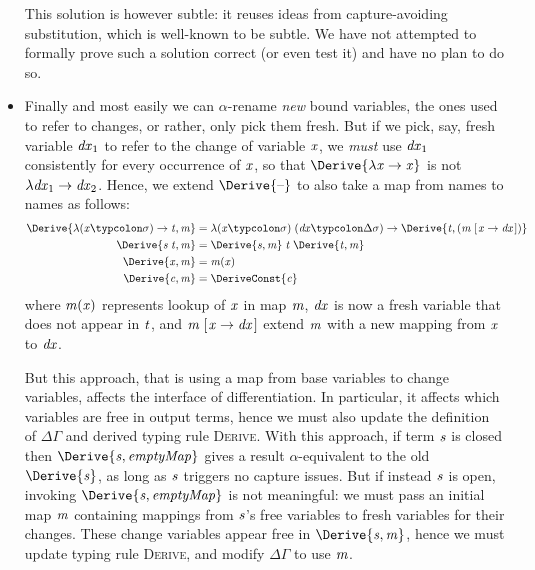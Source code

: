 \begin{itemize}
  This solution is however subtle: it reuses ideas from
  capture-avoiding substitution, which is well-known to be
  subtle. We have not attempted to formally prove such a solution
  correct (or even test it) and have no plan to do so.
\item Finally and most easily we can $\alpha$-rename \emph{new}
  bound variables, the ones used to refer to changes, or rather,
  only pick them fresh. But if we pick, say, fresh variable \ensuremath{\Varid{dx}_{1}}
  to refer to the change of variable \ensuremath{\Varid{x}}, we \emph{must} use
  \ensuremath{\Varid{dx}_{1}} consistently for every occurrence of \ensuremath{\Varid{x}}, so that
  \ensuremath{\Derive{\lambda \Varid{x}\to \Varid{x}}} is not \ensuremath{\lambda \Varid{dx}_{1}\to \Varid{dx}_{2}}. Hence, we extend
  \ensuremath{\Derive{\text{\textendash}}} to also take a map from names to names as
  follows:
\begin{align*}
  \ensuremath{\Derive{\lambda (\Varid{x}\typcolon\sigma)\to \Varid{t},\Varid{m}}} &= \ensuremath{\lambda (\Varid{x}\typcolon\sigma)\;(\Varid{dx}\typcolon\Delta \sigma)\to \Derive{\Varid{t},(\Varid{m}\;[\mskip1.5mu \Varid{x}\to \Varid{dx}\mskip1.5mu])}} \\
  \ensuremath{\Derive{\Varid{s}\;\Varid{t},\Varid{m}}} &= \ensuremath{\Derive{\Varid{s},\Varid{m}}\;\Varid{t}\;\Derive{\Varid{t},\Varid{m}}} \\
  \ensuremath{\Derive{\Varid{x},\Varid{m}}} &= \ensuremath{\Varid{m} (\Varid{x})} \\
  \ensuremath{\Derive{\Varid{c},\Varid{m}}} &= \ensuremath{\DeriveConst{\Varid{c}}}
\end{align*}
where \ensuremath{\Varid{m} (\Varid{x})} represents lookup of \ensuremath{\Varid{x}} in map \ensuremath{\Varid{m}},
\ensuremath{\Varid{dx}} is now a fresh variable that does not appear in \ensuremath{\Varid{t}},
and \ensuremath{\Varid{m}\;[\mskip1.5mu \Varid{x}\to \Varid{dx}\mskip1.5mu]} extend \ensuremath{\Varid{m}} with a new mapping from \ensuremath{\Varid{x}} to \ensuremath{\Varid{dx}}.

  But this approach, that is using a map from base variables to change
  variables, affects the interface of differentiation. In
  particular, it affects which variables are free in output terms, hence we must
  also update the definition of \ensuremath{\Delta \Gamma} and derived typing rule
  \textsc{Derive}.
  With this approach, if term \ensuremath{\Varid{s}} is closed then \ensuremath{\Derive{\Varid{s},\Varid{emptyMap}}} gives a result
  $\alpha$-equivalent to the old \ensuremath{\Derive{\Varid{s}}}, as long
  as \ensuremath{\Varid{s}} triggers no capture issues. But if instead \ensuremath{\Varid{s}} is open, invoking
  \ensuremath{\Derive{\Varid{s},\Varid{emptyMap}}} is not meaningful: we must
  pass an initial map \ensuremath{\Varid{m}} containing mappings from \ensuremath{\Varid{s}}'s free variables to fresh
  variables for their changes. These change variables appear free in \ensuremath{\Derive{\Varid{s},\Varid{m}}}, hence we must update typing rule \textsc{Derive}, and modify \ensuremath{\Delta \Gamma}
  to use \ensuremath{\Varid{m}}.


\end{itemize}
